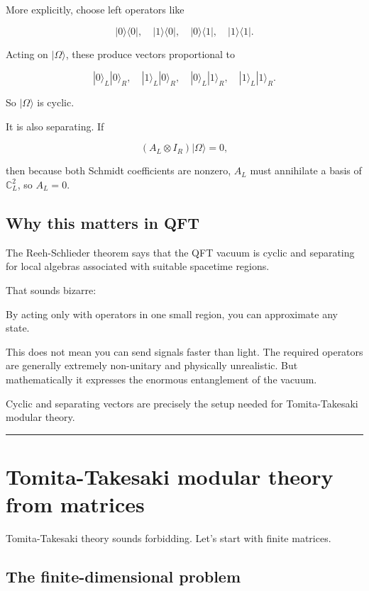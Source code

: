 \documentclass[11pt,a4paper]{article}
\newenvironment{qiqtquote}{\begin{mdframed}[style=quotestyle]}{\end{mdframed}}
\begin{document}
More explicitly, choose left operators like

\[
|0\rangle\langle0|,\quad |1\rangle\langle0|,\quad |0\rangle\langle1|,\quad |1\rangle\langle1|.
\]

Acting on $|\Omega\rangle$, these produce vectors proportional to

\[
|0\rangle_L|0\rangle_R,\quad
|1\rangle_L|0\rangle_R,\quad
|0\rangle_L|1\rangle_R,\quad
|1\rangle_L|1\rangle_R.
\]

So $|\Omega\rangle$ is cyclic.

It is also separating. If

\[
(A_L\otimes I_R)|\Omega\rangle=0,
\]

then because both Schmidt coefficients are nonzero, $A_L$ must annihilate a basis of $\mathbb{C}^2_L$, so $A_L=0$.

\subsection{Why this matters in QFT}

The Reeh-Schlieder theorem says that the QFT vacuum is cyclic and separating for local algebras associated with suitable spacetime regions.

That sounds bizarre:

\begin{qiqtquote}
By acting only with operators in one small region, you can approximate any state.
\end{qiqtquote}

This does not mean you can send signals faster than light. The required operators are generally extremely non-unitary and physically unrealistic. But mathematically it expresses the enormous entanglement of the vacuum.

Cyclic and separating vectors are precisely the setup needed for Tomita-Takesaki modular theory.

\medskip\hrule\medskip

\section{Tomita-Takesaki modular theory from matrices}

Tomita-Takesaki theory sounds forbidding. Let’s start with finite matrices.

\subsection{The finite-dimensional problem}
\end{document}
